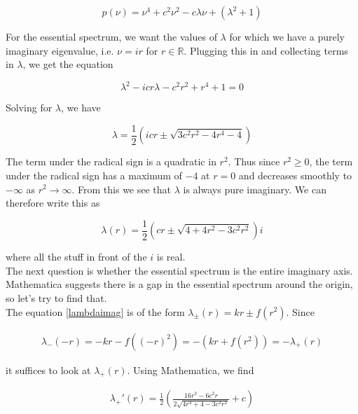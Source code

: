 \documentclass[12pt]{article}
\def\R{{\mathbb R}}
\begin{document}
\begin{equation}\label{charpoly}
p(\nu) = \nu^4 + c^2 \nu^2 - c \lambda \nu + (\lambda^2 + 1) 
\end{equation} 

For the essential spectrum, we want the values of $\lambda$ for which we have a purely imaginary eigenvalue, i.e. $\nu = i r$ for $r \in \R$. Plugging this in and collecting terms in $\lambda$, we get the equation

\begin{equation}\label{fredholmborder}
\lambda^2 - i c r \lambda - c^2 r^2  + r^4 + 1 = 0 
\end{equation} 

Solving for $\lambda$, we have

\begin{equation}
\lambda = \frac{1}{2} \left(i c r \pm 
\sqrt{3 c^2 r^2-4 r^4-4}\right)
\end{equation}

The term under the radical sign is a quadratic in $r^2$. Thus since $r^2 \geq 0$, the term under the radical sign has a maximum of $-4$ at $r = 0$ and decreases smoothly to $-\infty$ as $r^2 \rightarrow \infty$. From this we see that $\lambda$ is always pure imaginary. We can therefore write this as

\begin{equation}\label{lambdaimag}
\lambda(r) = \frac{1}{2} \left(c r \pm 
\sqrt{4 + 4 r^2 -3 c^2 r^2 }\right) i
\end{equation}

where all the stuff in front of the $i$ is real.\\

The next question is whether the essential spectrum is the entire imaginary axis. Mathematica suggests there is a gap in the essential spectrum around the origin, so let's try to find that.\\

The equation \eqref{lambdaimag} is of the form $\lambda_\pm(r) = k r \pm f(r^2)$. Since

\begin{align*}
\lambda_-(-r) = -kr - f((-r)^2) = -(kr + f(r^2)) = -\lambda_+(r)
\end{align*} 

it suffices to look at $\lambda_+(r)$. Using Mathematica, we find

\begin{align*}
\lambda_+'(r) = \frac{1}{2} \left(\frac{16 r^3-6 c^2 r}{2 \sqrt{4 r^4+4-3 c^2 r^2}}+c\right)
\end{align*}
\end{document}
